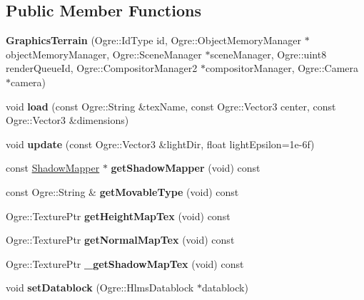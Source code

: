 \subsection*{Public Member Functions}
\begin{DoxyCompactItemize}
\item 
\mbox{\label{class_graphics_terrain_ad09f3393bcb3dc279e0f682ec836532c}} 
{\bfseries Graphics\+Terrain} (Ogre\+::\+Id\+Type id, Ogre\+::\+Object\+Memory\+Manager $\ast$object\+Memory\+Manager, Ogre\+::\+Scene\+Manager $\ast$scene\+Manager, Ogre\+::uint8 render\+Queue\+Id, Ogre\+::\+Compositor\+Manager2 $\ast$compositor\+Manager, Ogre\+::\+Camera $\ast$camera)
\item 
\mbox{\label{class_graphics_terrain_ab8dbd55a773ceb3940ac85e0d79eaced}} 
void {\bfseries load} (const Ogre\+::\+String \&tex\+Name, const Ogre\+::\+Vector3 center, const Ogre\+::\+Vector3 \&dimensions)
\item 
\mbox{\label{class_graphics_terrain_ad97766d268fc7fd379bf40f4194739d4}} 
void {\bfseries update} (const Ogre\+::\+Vector3 \&light\+Dir, float light\+Epsilon=1e-\/6f)
\item 
\mbox{\label{class_graphics_terrain_a437b37d2a5cc809b26d73e10856e73e9}} 
const \hyperlink{class_shadow_mapper}{Shadow\+Mapper} $\ast$ {\bfseries get\+Shadow\+Mapper} (void) const
\item 
\mbox{\label{class_graphics_terrain_aed6da11b79b85601fe23059fb4eaeb56}} 
const Ogre\+::\+String \& {\bfseries get\+Movable\+Type} (void) const
\item 
\mbox{\label{class_graphics_terrain_a30e288df42390fb9df74d3bf8ed5575f}} 
Ogre\+::\+Texture\+Ptr {\bfseries get\+Height\+Map\+Tex} (void) const
\item 
\mbox{\label{class_graphics_terrain_a8cfec476235c065efb3d7d29168a8495}} 
Ogre\+::\+Texture\+Ptr {\bfseries get\+Normal\+Map\+Tex} (void) const
\item 
\mbox{\label{class_graphics_terrain_ad52653eed5c22be28e7a185f0eed87b7}} 
Ogre\+::\+Texture\+Ptr {\bfseries \+\_\+get\+Shadow\+Map\+Tex} (void) const
\item 
\mbox{\label{class_graphics_terrain_af5b0244ad8598ede54145e5398726e26}} 
void {\bfseries set\+Datablock} (Ogre\+::\+Hlms\+Datablock $\ast$datablock)
\end{DoxyCompactItemize}
